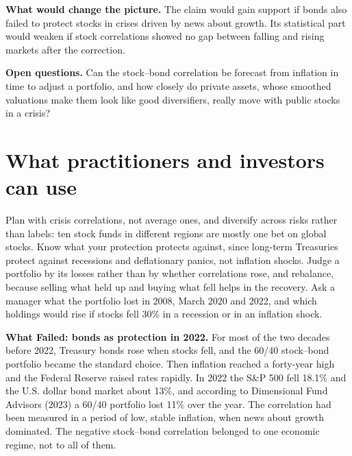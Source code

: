 \textbf{What would change the picture.} The claim would gain support if bonds also failed to protect stocks in crises driven by news about growth. Its statistical part would weaken if stock correlations showed no gap between falling and rising markets after the correction.

\label{sec:13-open}
\textbf{Open questions.} Can the stock--bond correlation be forecast from inflation in time to adjust a portfolio, and how closely do private assets, whose smoothed valuations make them look like good diversifiers, really move with public stocks in a crisis?

\section{What practitioners and investors can use}
\label{sec:13-investors}

Plan with crisis correlations, not average ones, and diversify across risks rather than labels: ten stock funds in different regions are mostly one bet on global stocks. Know what your protection protects against, since long-term Treasuries protect against recessions and deflationary panics, not inflation shocks. Judge a portfolio by its losses rather than by whether correlations rose, and rebalance, because selling what held up and buying what fell helps in the recovery. Ask a manager what the portfolio lost in 2008, March 2020 and 2022, and which holdings would rise if stocks fell 30\% in a recession or in an inflation shock.

\begin{callout}
\textbf{What Failed: bonds as protection in 2022.} For most of the two decades before 2022, Treasury bonds rose when stocks fell, and the 60/40 stock--bond portfolio became the standard choice. Then inflation reached a forty-year high and the Federal Reserve raised rates rapidly. In 2022 the S\&P 500 fell 18.1\% and the U.S. dollar bond market about 13\%, and according to Dimensional Fund Advisors (2023) a 60/40 portfolio lost 11\% over the year. The correlation had been measured in a period of low, stable inflation, when news about growth dominated. The negative stock--bond correlation belonged to one economic regime, not to all of them.
\end{callout}

\makeatletter
{}
\makeatother

